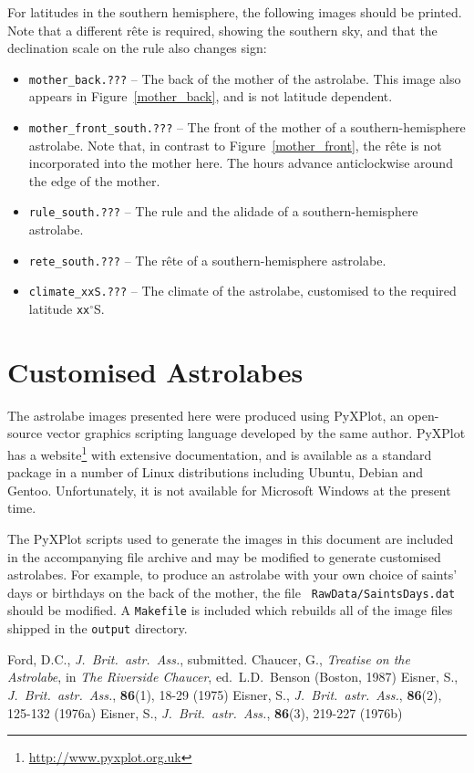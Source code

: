 \documentclass[a4paper,onecolumn,10pt]{article}
\begin{document}
For latitudes in the southern hemisphere, the following images should be
printed. Note that a different r\^ete is required, showing the southern sky,
and that the declination scale on the rule also changes sign:
\begin{itemize}
\item {\tt mother\_back.???} -- The back of the mother of the astrolabe. This image also appears in Figure~\ref{mother_back}, and is not latitude dependent.
\item {\tt mother\_front\_south.???} -- The front of the mother of a southern-hemi\-sp\-here astrolabe. Note that, in contrast to Figure~\ref{mother_front}, the r\^ete is not incorporated into the mother here. The hours advance anticlockwise around the edge of the mother.
\item {\tt rule\_south.???} -- The rule and the alidade of a southern-hemisphere astrolabe.
\item {\tt rete\_south.???} -- The r\^ete of a southern-hemisphere astrolabe.
\item{\tt climate\_xxS.???} -- The climate of the astrolabe, customised to the required latitude {\tt xx}$^\circ$S.
\end{itemize}

\section*{Customised Astrolabes}

The astrolabe images presented here were produced using PyXPlot, an open-source
vector graphics scripting language developed by the same author.  PyXPlot has a
website\footnote{\url{http://www.pyxplot.org.uk}} with extensive documentation,
and is available as a standard package in a number of Linux distributions
including Ubuntu, Debian and Gentoo. Unfortunately, it is not available for
Microsoft Windows at the present time.

The PyXPlot scripts used to generate the images in this document are included
in the accompanying file archive and may be modified to generate customised
astrolabes. For example, to produce an astrolabe with your own choice of
saints' days or birthdays on the back of the mother, the file {\tt
Raw\-Data/\-Saints\-Days\-.dat} should be modified. A {\tt Makefile} is
included which rebuilds all of the image files shipped in the {\tt output}
directory.

\begin{thebibliography}{9}
Ford, D.C., \textit{J.\ Brit.\ astr.\ Ass.}, submitted.
Chaucer, G., \textit{Treatise on the Astrolabe}, in {\it The Riverside Chaucer}, ed.\ L.D.\ Benson (Boston, 1987)
Eisner, S., \textit{J.\ Brit.\ astr.\ Ass.}, \textbf{86}(1), 18-29 (1975)
Eisner, S., \textit{J.\ Brit.\ astr.\ Ass.}, \textbf{86}(2), 125-132 (1976a)
Eisner, S., \textit{J.\ Brit.\ astr.\ Ass.}, \textbf{86}(3), 219-227 (1976b)
\end{thebibliography}
\end{document}
